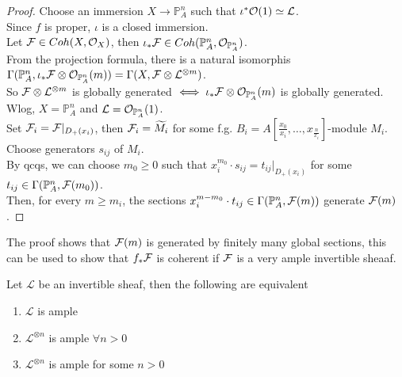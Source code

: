 \documentclass[../main.tex]{subfiles}
\begin{document}
\begin{proof}
Choose an immersion $X\to \mathbb{P}^{n}_A$ such that $\iota^{\ast}\mathcal{O}( 1) \simeq \mathcal{L}$.\\
Since $f$ is proper, $\iota$ is a closed immersion.\\
Let $\mathcal{F}\in Coh( X,\mathcal{O}_X) $, then $\iota_\ast \mathcal{F}\in Coh(  \mathbb{P}^{n}_A, \mathcal{O}_{ \mathbb{P}^{n}_A} ) $.\\
From the projection formula, there is a natural isomorphis $\Gamma(  \mathbb{P}^{n}_A, \iota_\ast \mathcal{F} \otimes \mathcal{O}_{\mathbb{P}^{n}_A} ( m) ) = \Gamma( X, \mathcal{F} \otimes \mathcal{L}^{\otimes m}) $.\\
So $\mathcal{F} \otimes \mathcal{L}^{\otimes m}$ is globally generated $\iff \iota_\ast \mathcal{F} \otimes \mathcal{O}_{\mathbb{P}^{n}_A} ( m) $ is globally generated.\\
Wlog, $X= \mathbb{P}^{n}_A$ and $ \mathcal{L}= \mathcal{O}_{\mathbb{P}^{n}_A} ( 1) $.\\
Set $ \mathcal{F}_i= \mathcal{F}|_{D_+( x_i) }$, then $\mathcal{F}_i = \widetilde{M_i}$ for some f.g. $B_i = A[ \frac{x_0}{x_i},\ldots, x_\frac{n}{x_i}]$-module $M_i$.\\
Choose generators $s_{ij}$ of $M_i$.\\
By qcqs, we can choose $m_0 \geq 0$ such that $x_{i}^{m_0}\cdot s_{ij}= t_{ij} |_{D_+( x_i) }  $ for some $t_{ij} \in \Gamma(  \mathbb{P}^{n}_A, \mathcal{F}( m_0) ) $.\\
Then, for every $m \geq m_i$, the sections $ x_i^{m-m_0}\cdot t_{ij} \in \Gamma(  \mathbb{P}^{n}_A, \mathcal{F}( m) ) $ generate $\mathcal{F}( m) $.
\end{proof}
\begin{rmq}
The proof shows that $\mathcal{F}( m) $ is generated by finitely many global sections, this can be used to show that $f_\ast \mathcal{F}$ is coherent if $\mathcal{F} $ is a very ample invertible sheaaf.
\end{rmq}
\begin{lemma}
Let $ \mathcal{L}$ be an invertible sheaf, then the following are equivalent
\begin{enumerate}
\item $\mathcal{L}$ is ample
\item  $ \mathcal{L}^{\otimes n}$ is ample $\forall n >0$ 
\item $ \mathcal{L}^{\otimes n}$ is ample for some $n >0$ 
\end{enumerate}
\end{lemma}
\end{document}
